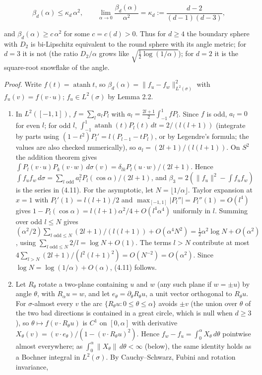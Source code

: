 \documentclass[
  british,
  11pt,
  a4paper,
]{article}
\begin{document}
\[
\beta_d(\alpha)\leq\kappa_d\,\alpha^2,
\qquad
\lim_{\alpha\to0}\frac{\beta_d(\alpha)}{\alpha^2}=\kappa_d:=\frac{d-2}{(d-1)(d-3)},
\tag{4.12}
\]

and \(\beta_d(\alpha)\geq c\,\alpha^2\) for some \(c=c(d)>0\). Thus for
\(d\geq4\) the boundary sphere with \(D_2\) is bi-Lipschitz equivalent
to the round sphere with its angle metric; for \(d=3\) it is not (the
ratio \(D_2/\alpha\) grows like \(\sqrt{\tfrac12\log(1/\alpha)}\)); for
\(d=2\) it is the square-root snowflake of the angle.

\emph{Proof.} Write \(f(t)=\operatorname{atanh}t\), so
\(\beta_d(\alpha)=\|f_u-f_w\|^2_{L^2(\sigma)}\) with
\(f_u(v)=f(v\cdot u)\); \(f_u\in L^2(\sigma)\) by Lemma 2.2.

\begin{enumerate}
\def\labelenumi{(\roman{enumi})}
\setcounter{enumi}{1}
\item
  In \(L^2([-1,1])\), \(f=\sum_l a_lP_l\) with
  \(a_l=\tfrac{2l+1}2\int_{-1}^1 f P_l\). Since \(f\) is odd, \(a_l=0\)
  for even \(l\); for odd \(l\),
  \(\int_{-1}^1\operatorname{atanh}(t)P_l(t)\,dt=2/(l(l+1))\) (integrate
  by parts using \((1-t^2)P_l'=l(P_{l-1}-tP_l)\), or by Legendre's
  formula; the values are also checked numerically), so
  \(a_l=(2l+1)/(l(l+1))\). On \(S^2\) the addition theorem gives
  \(\int P_l(v\cdot u)P_k(v\cdot w)\,d\sigma(v)=\delta_{lk}P_l(u\cdot w)/(2l+1)\).
  Hence
  \(\int f_uf_w\,d\sigma=\sum_{l\text{ odd}}a_l^2P_l(\cos\alpha)/(2l+1)\),
  and \(\beta_3=2(\|f_u\|^2-\int f_uf_w)\) is the series in (4.11). For
  the asymptotic, let \(N=\lfloor1/\alpha\rfloor\). Taylor expansion at
  \(x=1\) with \(P_l'(1)=l(l+1)/2\) and
  \(\max_{[-1,1]}|P_l''|=P_l''(1)=O(l^4)\) gives
  \(1-P_l(\cos\alpha)=l(l+1)\alpha^2/4+O(l^4\alpha^4)\) uniformly in
  \(l\). Summing over odd \(l\leq N\) gives
  \((\alpha^2/2)\sum_{l\text{ odd}\leq N}(2l+1)/(l(l+1))+O(\alpha^4N^2)=\tfrac12\alpha^2\log N+O(\alpha^2)\),
  using \(\sum_{l\text{ odd}\leq N}2/l=\log N+O(1)\). The terms \(l>N\)
  contribute at most
  \(4\sum_{l>N}(2l+1)/(l^2(l+1)^2)=O(N^{-2})=O(\alpha^2)\). Since
  \(\log N=\log(1/\alpha)+O(\alpha)\), (4.11) follows.
\item
  Let \(R_\theta\) rotate a two-plane containing \(u\) and \(w\) (any
  such plane if \(w=\pm u\)) by angle \(\theta\), with \(R_\alpha u=w\),
  and let \(e_\theta=\partial_\theta R_\theta u\), a unit vector
  orthogonal to \(R_\theta u\). For \(\sigma\)-almost every \(v\) the
  arc \(\{R_\theta u:0\leq\theta\leq\alpha\}\) avoids \(\pm v\) (the
  union over \(\theta\) of the two bad directions is contained in a
  great circle, which is null when \(d\geq3\)), so
  \(\theta\mapsto f(v\cdot R_\theta u)\) is \(C^1\) on \([0,\alpha]\)
  with derivative
  \(X_\theta(v)=(v\cdot e_\theta)/(1-(v\cdot R_\theta u)^2)\). Hence
  \(f_w-f_u=\int_0^\alpha X_\theta\,d\theta\) pointwise almost
  everywhere; as \(\int_0^\alpha\|X_\theta\|\,d\theta<\infty\) (below),
  the same identity holds as a Bochner integral in \(L^2(\sigma)\). By
  Cauchy--Schwarz, Fubini and rotation invariance,
\end{enumerate}
\end{document}
